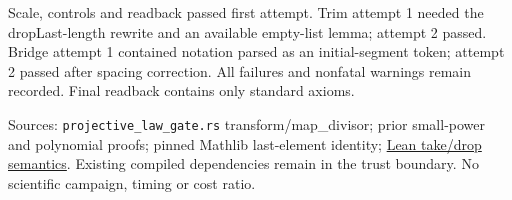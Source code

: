 \documentclass[10pt]{article}
\begin{document}
Scale, controls and readback passed first attempt. Trim attempt 1 needed the dropLast-length rewrite and an available empty-list lemma; attempt 2 passed. Bridge attempt 1 contained notation parsed as an initial-segment token; attempt 2 passed after spacing correction. All failures and nonfatal warnings remain recorded. Final readback contains only standard axioms.

Sources: \texttt{projective\_law\_gate.rs} transform/map\_divisor; prior small-power and polynomial proofs; pinned Mathlib last-element identity; \href{https://lean-lang.org/doc/api/Init/Data/List/TakeDrop.html}{Lean take/drop semantics}. Existing compiled dependencies remain in the trust boundary. No scientific campaign, timing or cost ratio.
\end{document}
